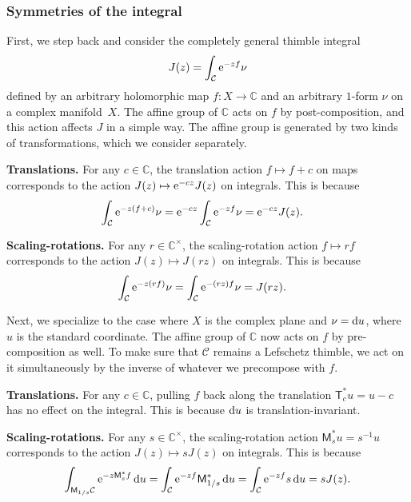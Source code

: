 \documentclass[10pt,a4paper]{amsart}
\newcommand{\maps}{\colon}
\newcommand{\C}{\mathbb{C}}
\numberwithin{equation}{section}
\begin{document}
\subsubsection{Symmetries of the integral}\label{sec:int-symm}
First, we step back and consider the completely general thimble integral
\[
J(z) = \int_{\mathcal{C}} {\rm e}^{-zf} \nu
\]
defined by an arbitrary holomorphic map $f \maps X \to \C$ and an arbitrary $1$-form $\nu$ on a complex manifold~$X$. The affine group of $\C$ acts on $f$ by post-composition, and this action affects $J$ in a simple way. The affine group is generated by two kinds of transformations, which we consider separately.

\textbf{Translations.}
For any $c \in \C$, the translation action $f \mapsto f + c$ on maps corresponds to the action
$J(z) \mapsto {\rm e}^{-cz} J(z)$
on integrals. This is because
\begin{align*}
\int_\mathcal{C} {\rm e}^{-z(f + c)} \nu &= {\rm e}^{-cz} \int_\mathcal{C} {\rm e}^{-zf} \nu = {\rm e}^{-cz} J(z).
\end{align*}

\textbf{Scaling-rotations.}
For any $r \in \C^\times$, the scaling-rotation action $f \mapsto rf$ corresponds to the action
$J(z) \mapsto J(rz)$
on integrals. This is because
\begin{align*}
\int_\mathcal{C} {\rm e}^{-z(rf)} \nu & = \int_\mathcal{C} {\rm e}^{-(rz)f} \nu = J(rz).
\end{align*}

Next, we specialize to the case where $X$ is the complex plane and $\nu = {\rm d}u$, where $u$ is the standard coordinate. The affine group of $\C$ now acts on $f$ by pre-composition as well. To make sure that $\mathcal{C}$ remains a Lefschetz thimble, we act on it simultaneously by the inverse of whatever we precompose with $f$.

 \textbf{Translations.}
For any $c \in \C$, pulling $f$ back along the translation $\mathsf{T}_c^* u = u - c$ has no effect on the integral. This is because ${\rm d}u$ is translation-invariant.

\textbf{Scaling-rotations.}
For any $s \in \C^\times$, the scaling-rotation action $\mathsf{M}_s^* u = s^{-1} u$ corresponds to the action
$J(z) \mapsto s J(z)$
on integrals. This is because
\begin{align*}
\int_{\mathsf{M}_{1/s} \mathcal{C}} {\rm e}^{-z \mathsf{M}_s^* f}\, {\rm d}u = \int_\mathcal{C} {\rm e}^{-zf} \mathsf{M}_{1/s}^* \, {\rm d}u
 = \int_\mathcal{C} {\rm e}^{-zf} s \, {\rm d}u
 = s J(z).
\end{align*}
\end{document}
